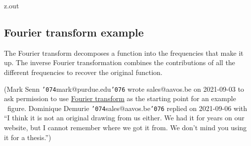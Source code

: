 \MyIO


\begin{VerbatimOut}{z.out}

\subsection{Fourier transform example}
  
The Fourier transform decomposes a function
into the frequencies that make it up.
The inverse Fourier transformation combines the contributions
of all the different frequencies to recover the original function.

(Mark Senn {\tt\char'074}mark@purdue.edu{\tt\char'076} wrote sales@aavos.be on 2021-09-03
to ask permission
to use
\href{https://aavos.eu/glossary/fourier-transform/}{Fourier transform}
as the starting point
for an example \TikZLogo\ figure.  
Dominique Demurie {\tt\char'074}sales@aavos.be{\tt\char'076} replied
on 2021-09-06 with
``I think it is not an original drawing from us either.
We had it for years on our website,
but I cannot remember where we got it from.
We don't mind you using it for a thesis.'')

%
%
  
\end{VerbatimOut}
